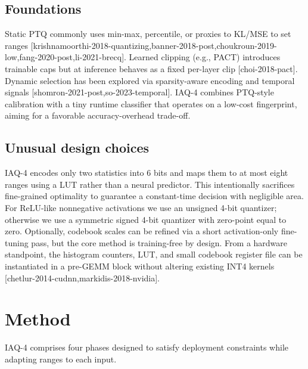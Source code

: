\documentclass{article}
\begin{document}
\subsection{Foundations}
Static PTQ commonly uses min-max, percentile, or proxies to KL/MSE to set ranges [krishnamoorthi-2018-quantizing,banner-2018-post,choukroun-2019-low,fang-2020-post,li-2021-brecq]. Learned clipping (e.g., PACT) introduces trainable caps but at inference behaves as a fixed per-layer clip [choi-2018-pact]. Dynamic selection has been explored via sparsity-aware encoding and temporal signals [shomron-2021-post,so-2023-temporal]. IAQ-4 combines PTQ-style calibration with a tiny runtime classifier that operates on a low-cost fingerprint, aiming for a favorable accuracy-overhead trade-off.

\subsection{Unusual design choices}
IAQ-4 encodes only two statistics into 6 bits and maps them to at most eight ranges using a LUT rather than a neural predictor. This intentionally sacrifices fine-grained optimality to guarantee a constant-time decision with negligible area. For ReLU-like nonnegative activations we use an unsigned 4-bit quantizer; otherwise we use a symmetric signed 4-bit quantizer with zero-point equal to zero. Optionally, codebook scales can be refined via a short activation-only fine-tuning pass, but the core method is training-free by design. From a hardware standpoint, the histogram counters, LUT, and small codebook register file can be instantiated in a pre-GEMM block without altering existing INT4 kernels [chetlur-2014-cudnn,markidis-2018-nvidia].

\section{Method}
IAQ-4 comprises four phases designed to satisfy deployment constraints while adapting ranges to each input.
\end{document}
